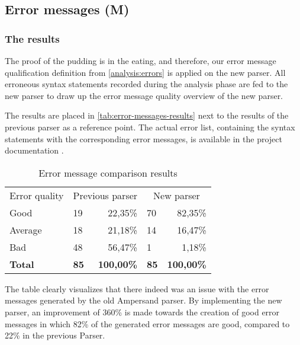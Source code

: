 
\subsection{Error messages  (M)}
\label{design:errors}

\subsubsection{The results}
The proof of the pudding is in the eating, and therefore, our error message qualification definition from \autoref{analysis:errors} is applied on the new parser.
All erroneous syntax statements recorded during the analysis phase are fed to the new parser to draw up the error message quality overview of the new parser.

The results are placed in \autoref{tab:error-messages-results} next to the results of the previous parser as a reference point.
The actual error list, containing the syntax statements with the corresponding error messages, is available in the project documentation .

\begin{table}[h]
  \centering
	\begin{tabular}{llrlr}
    Error quality  & \multicolumn{2}{c}{Previous parser} & \multicolumn{2}{c}{New parser} \\
		Good           & 19          & 22,35\%          & 70          & 82,35\%          \\
		Average        & 18          & 21,18\%          & 14          & 16,47\%          \\
		Bad            & 48          & 56,47\%          & 1           &  1,18\%          \\
		\rowcolor[HTML]{BBBBBB}
		\textbf{Total} & \textbf{85} & \textbf{100,00\%} & \textbf{85} & \textbf{100,00\%}
	\end{tabular}
  \caption{Error message comparison results}
  \label{tab:error-messages-results}
\end{table}

The table clearly visualizes that there indeed was an issue with the error messages generated by the old Ampersand parser.
By implementing the new parser, an improvement of 360\% is made towards the creation of good error messages in which 82\% of the generated error messages are good, compared to 22\% in the previous Parser.

